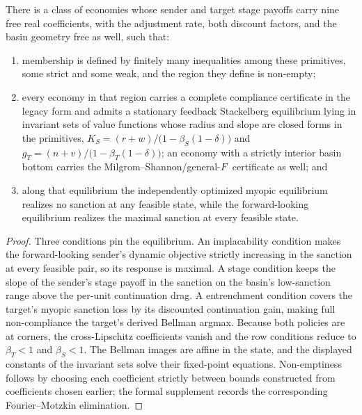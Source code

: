 \begin{proposition}
\label{prop:symbolic-family}
There is a class of economies whose sender and target stage payoffs carry
nine free real coefficients, with the adjustment rate, both discount
factors, and the basin geometry free as well, such that:
\begin{enumerate}[label=(\roman*)]
\item membership is defined by finitely many inequalities among these
primitives, some strict and some weak, and the region they define is non-empty;
\item every economy in that region carries a complete compliance certificate
in the legacy form and admits a stationary feedback Stackelberg equilibrium lying in
invariant sets of value functions whose radius and slope are closed forms in the primitives,
$K_S=(r+w)/\bigl(1-\beta_S(1-\delta)\bigr)$ and
$g_T=(n+v)/\bigl(1-\beta_T(1-\delta)\bigr)$; an economy with a strictly
interior basin bottom carries the
Milgrom--Shannon/general-$F$ certificate as well; and
\item along that equilibrium the independently optimized myopic
equilibrium realizes no sanction at any feasible state, while the
forward-looking equilibrium realizes the maximal sanction at every
feasible state.
\end{enumerate}
\end{proposition}

\begin{proof}
Three conditions pin the equilibrium. An implacability condition makes the
forward-looking sender's dynamic objective strictly increasing in the
sanction at every feasible pair, so its response is maximal. A stage
condition keeps the slope of the sender's stage payoff in the sanction on the basin's low-sanction range
above the per-unit continuation drag. A entrenchment condition covers the target's
myopic sanction loss by its discounted continuation gain, making full
non-compliance the target's derived Bellman argmax. Because both policies are
at corners, the cross-Lipschitz coefficients vanish and the row
conditions reduce to $\beta_T<1$ and $\beta_S<1$. The Bellman images are
affine in the state, and the displayed constants of the invariant sets solve their
fixed-point equations. Non-emptiness follows by choosing each
coefficient strictly between bounds constructed from coefficients
chosen earlier; the formal supplement records the corresponding
Fourier--Motzkin elimination.
\end{proof}

